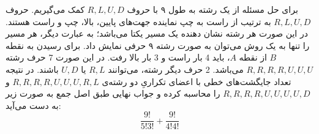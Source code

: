 \p
برای حل مسئله از یک رشته به طول ۹ با حروف
$R, L, U, D$
کمک می‌گیریم.
حروف
$R, L, U, D$
به ترتیب از راست به چپ نماینده جهت‌های پایین، بالا، چپ و راست هستند.
در این صورت هر رشته نشان دهنده یک مسیر یکتا می‌باشد؛ به عبارت دیگر، هر مسیر را تنها به یک روش می‌توان به صورت رشته ۹ حرفی نمایش داد.
برای رسیدن به نقطه $B$ از نقطه 
$A$، 
باید 4 بار راست و 3 بار بالا رفت. در این صورت 7 حرف رشته 
$R,R,R,R,U,U,U$
می‌باشد.
2 حرف دیگر رشته، 
می‌توانند
$R,L$ یا $U,D$
باشند.
‌‌در نتیجه تعداد جایگشت‌های خطی با اعضای تکراریِ‌ دو رشته‌ی 
$R,R,R,R,U,U,U,R,L$ و $R,R,R,R,U,U,U,U,D$
را محاسبه‌ کرده 
و ‌جواب نهایی طبق اصل جمع به صورت زیر 
به دست می‌آید:
$$\frac{9!}{5! 3!} + \frac{9!}{4! 4!}$$

